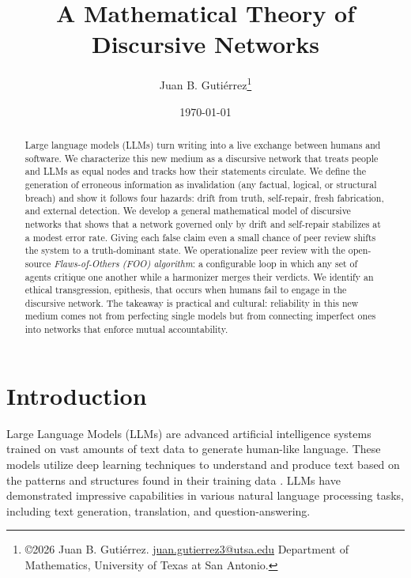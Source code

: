 \documentclass[12pt]{article}
\title{A Mathematical Theory of Discursive Networks}
\author{
    Juan B. Gutiérrez\footnote{\copyright 2026 Juan B. Gutiérrez. \href{mailto:juan.gutierrez3@utsa.edu}{juan.gutierrez3@utsa.edu} Department of Mathematics, University of Texas at San Antonio.}  \phantom{ } 
}
\date{\today}
\theoremstyle{definition}
\begin{document}
\maketitle

\begin{abstract}
Large language models (LLMs) turn writing into a live exchange between humans and software. We characterize this new medium as a  discursive network that treats people and LLMs as equal nodes and tracks how their statements circulate. We define the generation of erroneous information as invalidation (any factual, logical, or structural breach) and show it follows four hazards: drift from truth, self-repair, fresh fabrication, and external detection. We develop a general mathematical model of discursive networks that shows that a network governed only by drift and self-repair stabilizes at a modest error rate. Giving each false claim even a small chance of peer review shifts the system to a truth-dominant state.   We operationalize peer review with the open-source \emph{Flaws-of-Others (FOO) algorithm}: a configurable loop in which any set of agents critique one another while a harmonizer merges their verdicts. We identify an ethical transgression, epithesis, that occurs when humans fail to engage in the discursive network. The takeaway is practical and cultural: reliability in this new medium comes not from perfecting single models but from connecting imperfect ones into networks that enforce mutual accountability.
\end{abstract}

\tableofcontents

\section{Introduction}
Large Language Models (LLMs) are advanced artificial intelligence systems trained on vast amounts of text data to generate human-like language. These models utilize deep learning techniques to understand and produce text based on the patterns and structures found in their training data \parencite{vaswani2017attention, brown2020language}. LLMs have demonstrated impressive capabilities in various natural language processing tasks, including text generation, translation, and question-answering.
\end{document}
